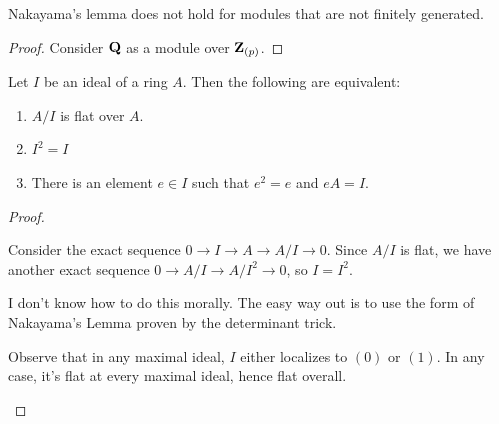 \begin{exer}
	Nakayama's lemma does not hold for modules that are not finitely
	generated.
\end{exer}
\begin{proof}
	Consider $\mathbf{Q}$ as a module over $\mathbf{Z}_{(p)}$.
\end{proof}

\begin{exer}
	Let $I$ be an ideal of a ring $A$. Then the following are equivalent:
	\begin{enumerate}[label=(\alph*)]
		\item $A/I$ is flat over $A$.
		\item $I^2 = I$
		\item There is an element $e \in I$ such that $e^2 = e$ and
			$eA = I$.
	\end{enumerate}
\end{exer}
\begin{proof}
	\begin{description}[leftmargin=*,font=\normalfont]
		\item[((i)$\Rightarrow$(ii))]
			Consider the exact sequence $0 \to I \to A \to A/I \to
			0$. Since $A/I$ is flat, we have another exact sequence
			$0 \to A/I \to A/I^2 \to 0$, so $I = I^2$.
		\item[((ii)$\Rightarrow$(iii))]
			I don't know how to do this morally. The easy way out
			is to use the form of Nakayama's Lemma proven by the
			determinant trick.
		\item[((iii)$\Rightarrow$(i))]
			Observe that in any maximal ideal, $I$ either localizes
			to $(0)$ or $(1)$. In any case, it's flat at every
			maximal ideal, hence flat overall.
	\end{description}
\end{proof}
